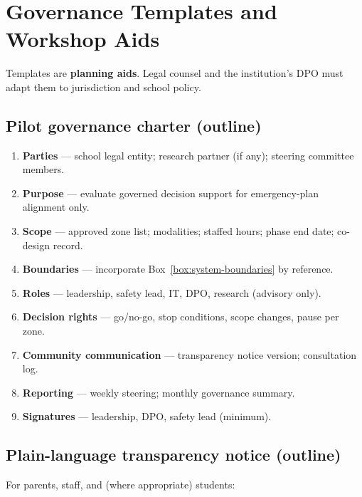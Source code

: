 \section{Governance Templates and Workshop Aids}
\label{app:governance-templates}

Templates are \textbf{planning aids}.
Legal counsel and the institution's DPO must adapt them to jurisdiction and school policy.

\subsection{Pilot governance charter (outline)}

\begin{enumerate}[noitemsep]
  \item \textbf{Parties} --- school legal entity; research partner (if any); steering committee members.
  \item \textbf{Purpose} --- evaluate governed decision support for emergency-plan alignment only.
  \item \textbf{Scope} --- approved zone list; modalities; staffed hours; phase end date; co-design record.
  \item \textbf{Boundaries} --- incorporate Box~\ref{box:system-boundaries} by reference.
  \item \textbf{Roles} --- leadership, safety lead, IT, DPO, research (advisory only).
  \item \textbf{Decision rights} --- go/no-go, stop conditions, scope changes, pause per zone.
  \item \textbf{Community communication} --- transparency notice version; consultation log.
  \item \textbf{Reporting} --- weekly steering; monthly governance summary.
  \item \textbf{Signatures} --- leadership, DPO, safety lead (minimum).
\end{enumerate}

\subsection{Plain-language transparency notice (outline)}

For parents, staff, and (where appropriate) students:

